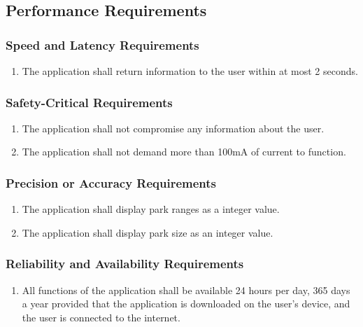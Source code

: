 \documentclass[titlepage]{article}
\begin{document}

\subsection{Performance Requirements}
\label{sub:performance_requirements}

\subsubsection{Speed and Latency Requirements}
\label{ssub:speed_and_latency_requirements}
\begin{enumerate}[{PR}1. ]
	\item The application shall return information to the user within at most 2 seconds. 
\end{enumerate}

\subsubsection{Safety-Critical Requirements}
\label{ssub:safety_critical_requirements}
\begin{enumerate}[{PR}1. ]
	\item The application shall not compromise any information about the user.
	\item The application shall not demand more than 100mA of current to function.  
\end{enumerate}

\subsubsection{Precision or Accuracy Requirements}
\label{ssub:precision_or_accuracy_requirements}
\begin{enumerate}[{PR}1. ]
	\item The application shall display park ranges as a integer value. 
	\item The application shall display park size as an integer value. 
	
\end{enumerate}

\subsubsection{Reliability and Availability Requirements}
\label{ssub:reliability_and_availability_requirements}
\begin{enumerate}[{PR}1. ]
	\item All functions of the application shall be available 24 hours per day, 365 days a year provided that the application is downloaded on the user's device, and the user is connected to the internet.
\end{enumerate}
\end{document}
